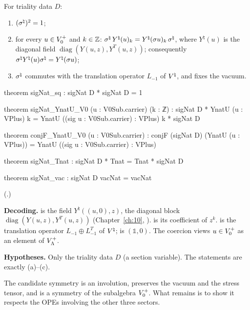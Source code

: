 \begin{theorem}\label{ch14:thm:signat}
For triality data $D$:
\begin{enumerate}[label=(\alph*)]
\item $(\sigma^{\natural})^2=1$;
\item for every $u\in V_0^{+}$ and $k\in{\mathbb{Z}}$: $\sigma^{\natural}\,Y^\natural(u)_k=Y^\natural(\sigma u)_k\,\sigma^{\natural}$,
  where $Y^\natural(u)$ is the diagonal field $\operatorname{diag}(Y(u,z),Y^T(u,z))$;
  consequently $\sigma^{\natural} Y^\natural(u)\sigma^{\natural}=Y^\natural(\sigma u)$;
\item $\sigma^{\natural}$ commutes with the translation operator $L_{-1}$ of ${V^{\natural}}$, and fixes the vacuum.
\end{enumerate}
\end{theorem}
\begin{leancode}
theorem sigNat_sq : sigNat D * sigNat D = 1

theorem sigNat_YnatU_V0 (u : V0Sub.carrier) (k : ℤ) :
    sigNat D * YnatU (u : VPlus) k = YnatU ((sig u : V0Sub.carrier) : VPlus) k * sigNat D

theorem conjF_YnatU_V0 (u : V0Sub.carrier) :
    conjF (sigNat D) (YnatU (u : VPlus)) = YnatU ((sig u : V0Sub.carrier) : VPlus)

theorem sigNat_Tnat : sigNat D * Tnat = Tnat * sigNat D

theorem sigNat_vac : sigNat D vacNat = vacNat
\end{leancode}
(.)

\begin{dictionary}
\textbf{Decoding.}   is the field $Y^\natural((u,0),z)$, the diagonal block
$\operatorname{diag}(Y(u,z),Y^T(u,z))$ (Chapter~\ref{ch:10}, ).  
is its coefficient of $z^k$.   is the translation operator $L_{-1}\oplus L_{-1}^T$ of ${V^{\natural}}$;
 is $(\mathbb 1,0)$.  The coercion  views $u\in V_0^{+}$ as an element of
$V_{\Lambda}^+$.

\textbf{Hypotheses.}  Only the triality data $D$ (a section variable).  The statements are exactly
(a)--(c).
\end{dictionary}
\begin{physics}
The candidate symmetry is an involution, preserves the vacuum and the stress tensor, and is a symmetry of the subalgebra $V_0^{+}$. What remains is to show it respects the OPEs involving the other three sectors.
\end{physics}


